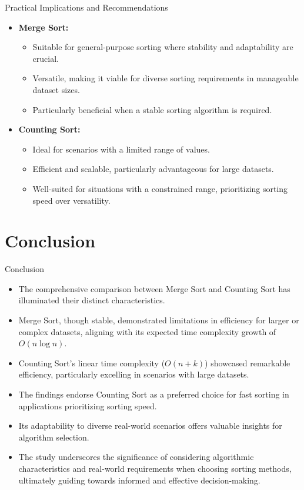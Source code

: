 \documentclass{beamer}
\begin{document}
\begin{frame}{Practical Implications and Recommendations}
		\begin{itemize}
			\item \textbf{Merge Sort:}
			\begin{itemize}
				\item Suitable for general-purpose sorting where stability and adaptability are crucial.
				\item Versatile, making it viable for diverse sorting requirements in manageable dataset sizes.
				\item Particularly beneficial when a stable sorting algorithm is required.
			\end{itemize}
			
			\item \textbf{Counting Sort:}
			\begin{itemize}
				\item Ideal for scenarios with a limited range of values.
				\item Efficient and scalable, particularly advantageous for large datasets.
				\item Well-suited for situations with a constrained range, prioritizing sorting speed over versatility.
			\end{itemize}
		\end{itemize}

\end{frame}


	\section{Conclusion}
	
	\begin{frame}{Conclusion}
		\begin{itemize}
			\item The comprehensive comparison between Merge Sort and Counting Sort has illuminated their distinct characteristics.
			\item Merge Sort, though stable, demonstrated limitations in efficiency for larger or complex datasets, aligning with its expected time complexity growth of \(O(n \log n)\).
			\item Counting Sort's linear time complexity (\(O(n + k)\)) showcased remarkable efficiency, particularly excelling in scenarios with large datasets.
		\end{itemize}
		
		
		\begin{itemize}
			\item The findings endorse Counting Sort as a preferred choice for fast sorting in applications prioritizing sorting speed.
			\item Its adaptability to diverse real-world scenarios offers valuable insights for algorithm selection.
			\item The study underscores the significance of considering algorithmic characteristics and real-world requirements when choosing sorting methods, ultimately guiding towards informed and effective decision-making.
		\end{itemize}
	\end{frame}
	
\end{document}
